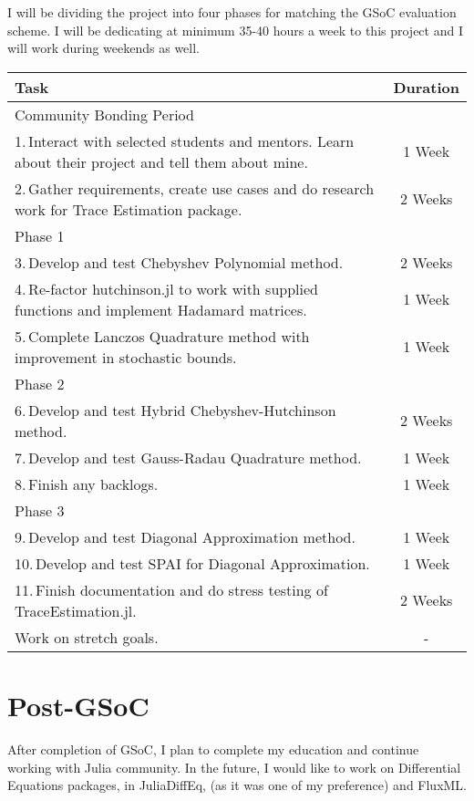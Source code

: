 \documentclass[12]{article}
\begin{document}
I will be dividing the project into four phases for matching the GSoC evaluation scheme. I will be dedicating at minimum 35-40 hours a week to this project and I will work during weekends as well.
\begin{center}
\begin{tabular}{||p{10.5cm} | c||}
\hline
\textbf{Task} & \textbf{Duration} \\
\hline \hline
Community Bonding Period & \\
1.\,Interact with selected students and mentors. Learn about their project and tell them about mine. & 1 Week\\
2.\,Gather requirements, create use cases and do research work for Trace Estimation package. & 2 Weeks\\  
\hline\hline
Phase 1 & \\
3.\,Develop and test Chebyshev Polynomial method. & 2 Weeks\\
4.\,Re-factor hutchinson.jl to work with supplied functions and implement Hadamard matrices. & 1 Week \\
5.\,Complete Lanczos Quadrature method with improvement in stochastic bounds. & 1 Week\\
\hline\hline
Phase 2 & \\
6.\,Develop and test Hybrid Chebyshev-Hutchinson method. & 2 Weeks\\
7.\,Develop and test Gauss-Radau Quadrature method. & 1 Week\\
8.\,Finish any backlogs. & 1 Week\\
\hline\hline
Phase 3 & \\
9.\,Develop and test Diagonal Approximation method. & 1 Week\\
10.\,Develop and test SPAI for Diagonal Approximation. & 1 Week\\
11.\,Finish documentation and do stress testing of TraceEstimation.jl. & 2 Weeks\\
\hline\hline
Work on stretch goals. & -\\
\hline\hline
\end{tabular}
\end{center} 
\bigskip
\bigskip
\bigskip
\section{Post-GSoC}
After completion of GSoC, I plan to complete my education and continue working with Julia community. In the future, I would like to work on Differential Equations packages, in JuliaDiffEq, (as it was one of my preference) and FluxML. 



\end{document}
